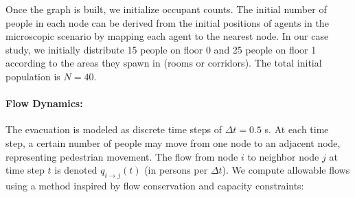 \documentclass[11pt,a4paper]{article}
\begin{document}
Once the graph is built, we initialize occupant counts. The initial number of people in each node can be derived from the initial positions of agents in the microscopic scenario by mapping each agent to the nearest node. In our case study, we initially distribute 15 people on floor 0 and 25 people on floor 1 according to the areas they spawn in (rooms or corridors). The total initial population is $N=40$.

\paragraph{Flow Dynamics:} The evacuation is modeled as discrete time steps of $\Delta t = 0.5$ s. At each time step, a certain number of people may move from one node to an adjacent node, representing pedestrian movement. The flow from node $i$ to neighbor node $j$ at time step $t$ is denoted $q_{i \to j}(t)$ (in persons per $\Delta t$). We compute allowable flows using a method inspired by flow conservation and capacity constraints:
\end{document}
